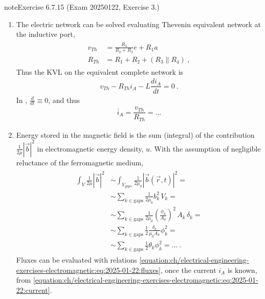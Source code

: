 \documentclass[letterpaper,10pt,english]{jupyterBook}
\begin{document}
\begin{sphinxadmonition}{note}{Exercise 6.7.15 (Exam 2025\sphinxhyphen{}01\sphinxhyphen{}22, Exercise 3.)}
\begin{enumerate}
\item {} 
\sphinxAtStartPar
The electric network can be solved evaluating Thevenin equivalent network at the inductive port,
\begin{equation*}
\begin{split}\begin{aligned}
     v_{Th} & = \frac{R_3}{R_2 + R_3} e + R_1 a \\
     R_{Th} & = R_1 + R_2 + \left( R_3 \parallel R_4 \right) \ ,
   \end{aligned}\end{split}
\end{equation*}
\sphinxAtStartPar
Thus the KVL on the equivalent complete network is
\begin{equation*}
\begin{split}v_{Th} - R_{Th} i_A - L \dfrac{d i_A}{d t} = 0 \ . \end{split}
\end{equation*}
\sphinxAtStartPar
In , \(\frac{d}{dt} \equiv 0\), and thus
\begin{equation}\label{equation:ch/electrical-engineering-exercises-electromagnetic:eq:2025-01-22:current}
\begin{split}\overline{i}_A = \dfrac{v_{Th}}{R_{Th}} = \dots \end{split}
\end{equation}
\item {} 
\sphinxAtStartPar
Energy stored in the magnetic field is the sum (integral) of the contribution \(\frac{1}{2 \mu} \left|\vec{b}\right|^2\) in electromagnetic energy density, \(u\). With the assumption of negligible reluctance of the ferromagnetic medium,
\begin{equation*}
\begin{split}\begin{aligned}
     \int_{V} \frac{1}{2 \mu} \left| \vec{b} \right|^2 
     & \sim \int_{V_{gaps}} \frac{1}{2 \mu_0} \left| \vec{b}(\vec{r},t) \right|^2 = \\
     & \sim \sum_{k \in \text{gaps}} \frac{1}{2 \mu_0} b_k^2 \, V_k = \\
     & \sim \sum_{k \in \text{gaps}} \frac{1}{2 \mu_0} \left(\frac{\phi_k}{A_k}\right)^2 \, A_k \, \delta_k = \\
     & \sim \sum_{k \in \text{gaps}} \frac{1}{2} \frac{\delta_k}{\mu_0 A_k} \phi_k^2 = \\
     & \sim \sum_{k \in \text{gaps}} \frac{1}{2} \theta_k \phi_k^2 = \dots \ .
   \end{aligned}\end{split}
\end{equation*}
\sphinxAtStartPar
Fluxes can be evaluated with relations \eqref{equation:ch/electrical-engineering-exercises-electromagnetic:eq:2025-01-22:fluxes}, once the current \(i_A\) is known, from \eqref{equation:ch/electrical-engineering-exercises-electromagnetic:eq:2025-01-22:current}.


\end{enumerate}
\end{sphinxadmonition}
\end{document}
